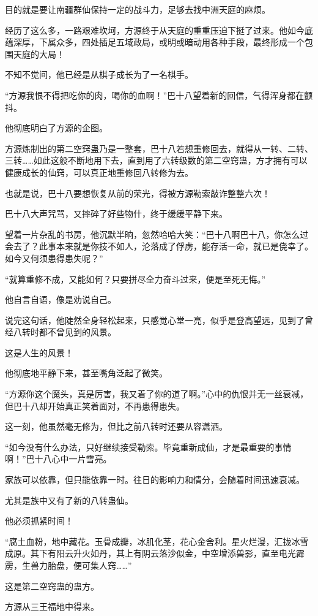 \begin{this_body}
目的就是要让南疆群仙保持一定的战斗力，足够去找中洲天庭的麻烦。

经历了这么多，一路艰难坎坷，方源终于从天庭的重重压迫下挺了过来。他如今底蕴深厚，下属众多，四处插足五域政局，或明或暗动用各种手段，最终形成一个包围天庭的大局！

不知不觉间，他已经是从棋子成长为了一名棋手。

“方源我恨不得把吃你的肉，喝你的血啊！”巴十八望着新的回信，气得浑身都在颤抖。

他彻底明白了方源的企图。

方源炼制出的第二空窍蛊乃是一整套，巴十八若想重修回去，就得从一转、二转、三转……如此这般不断地用下去，直到用了六转级数的第二空窍蛊，方才拥有可以健康成长的仙窍，可以真正地重修回八转修为去。

也就是说，巴十八要想恢复从前的荣光，得被方源勒索敲诈整整六次！

巴十八大声咒骂，又摔碎了好些物什，终于缓缓平静下来。

望着一片杂乱的书房，他沉默半晌，忽然哈哈大笑：“巴十八啊巴十八，你怎么过会去了？此事本来就是你技不如人，沦落成了俘虏，能存活一命，就已是侥幸了。如今又何须患得患失呢？”

“就算重修不成，又能如何？只要拼尽全力奋斗过来，便是至死无悔。”

他自言自语，像是劝说自己。

说完这句话，他陡然全身轻松起来，只感觉心堂一亮，似乎是登高望远，见到了曾经八转时都不曾见到的风景。

这是人生的风景！

他彻底地平静下来，甚至嘴角泛起了微笑。

“方源你这个魔头，真是厉害，我又着了你的道了啊。”心中的仇恨并无一丝衰减，但巴十八却开始真正笑着面对，不再患得患失。

这一刻，他虽然毫无修为，但比之前八转时还要从容潇洒。

“如今没有什么办法，只好继续接受勒索。毕竟重新成仙，才是最重要的事情啊！”巴十八心中一片雪亮。

家族可以依靠，但只能依靠一时。往日的影响力和情分，会随着时间迅速衰减。

尤其是族中又有了新的八转蛊仙。

他必须抓紧时间！

“腐土血粉，地中藏花。玉骨成瓣，冰肌化茎，花心金舍利。星火烂漫，汇拢冰雪成原。其下有阳云升火如丹，其上有阴云落沙似金，中空增添兽影，直至电光霹雳，生兽力胎盘，便可集人窍……”

这是第二空窍蛊的蛊方。

方源从三王福地中得来。


\end{this_body}
